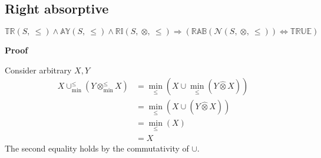 \documentclass[10pt]{article}
\newcommand{\propname}[1]{{\mathbb{#1}}}
\newcommand{\minlift}{\otimes_{\min}^{\leq}}
\newcommand{\lift}{\hat{\otimes}}
\newcommand{\minunion}{\cup_{\min}^{\leq}}
\newcommand{\proof}{\vspace{1em} \textbf{Proof} \vspace{1em}}
\begin{document}
\subsection{Right absorptive}

$\propname{TR}(S,\ \leq) \wedge \propname{AY}(S,\ \leq) \wedge \propname{RI}(S,\ \otimes,\ \leq) \Rightarrow (\propname{RAB}(\mathcal{N}(S,\ \otimes,\ \leq)) \Leftrightarrow \propname{TRUE})$

\proof

Consider arbitrary $X, Y$
\begin{align*}
X \minunion (Y \minlift X) 	& = \min_\leq(X \cup \min_\leq(Y \lift X)) \\
							& = \min_\leq(X \cup (Y \lift X)) \\
							& = \min_\leq(X) \\
							& = X	
\end{align*}
The second equality holds by the commutativity of $\cup$.
\end{document}

